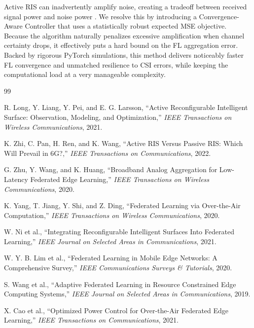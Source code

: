 \documentclass[journal, twocolumn]{IEEEtran}
\begin{document}
Active RIS can inadvertently amplify noise, creating a tradeoff between received signal power and noise power \cite{long2021active}. We resolve this by introducing a Convergence-Aware Controller that uses a statistically robust expected MSE objective. Because the algorithm naturally penalizes excessive amplification when channel certainty drops, it effectively puts a hard bound on the FL aggregation error. Backed by rigorous PyTorch simulations, this method delivers noticeably faster FL convergence and unmatched resilience to CSI errors, while keeping the computational load at a very manageable complexity.


\begin{thebibliography}{99}

R. Long, Y. Liang, Y. Pei, and E. G. Larsson, ``Active Reconfigurable Intelligent Surface: Observation, Modeling, and Optimization,'' \textit{IEEE Transactions on Wireless Communications}, 2021.

K. Zhi, C. Pan, H. Ren, and K. Wang, ``Active RIS Versus Passive RIS: Which Will Prevail in 6G?,'' \textit{IEEE Transactions on Communications}, 2022.

G. Zhu, Y. Wang, and K. Huang, ``Broadband Analog Aggregation for Low-Latency Federated Edge Learning,'' \textit{IEEE Transactions on Wireless Communications}, 2020.

K. Yang, T. Jiang, Y. Shi, and Z. Ding, ``Federated Learning via Over-the-Air Computation,'' \textit{IEEE Transactions on Wireless Communications}, 2020.

W. Ni et al., ``Integrating Reconfigurable Intelligent Surfaces Into Federated Learning,'' \textit{IEEE Journal on Selected Areas in Communications}, 2021.

W. Y. B. Lim et al., ``Federated Learning in Mobile Edge Networks: A Comprehensive Survey,'' \textit{IEEE Communications Surveys \& Tutorials}, 2020.

S. Wang et al., ``Adaptive Federated Learning in Resource Constrained Edge Computing Systems,'' \textit{IEEE Journal on Selected Areas in Communications}, 2019.

X. Cao et al., ``Optimized Power Control for Over-the-Air Federated Edge Learning,'' \textit{IEEE Transactions on Communications}, 2021.


\end{thebibliography}
\end{document}
